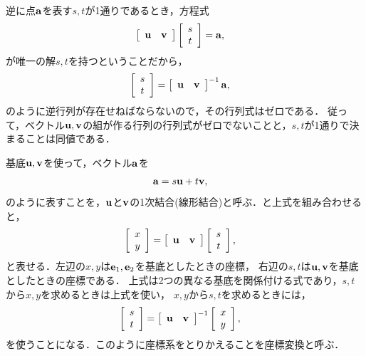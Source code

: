 逆に点${\bf a}$を表す$s,t$が1通りであるとき，方程式
\begin{align}
\left[\begin{array}{cc}
{\bf u} & {\bf v}\end{array}\right]\left[\begin{array}{c}
s\\
t
\end{array}\right] & ={\bf a}, 
\end{align}
が唯一の解$s,t$を持つということだから，
\begin{align}
\left[\begin{array}{c}
s\\
t
\end{array}\right] & =\left[\begin{array}{cc}
{\bf u} & {\bf v}\end{array}\right]^{-1}{\bf a},
\end{align}
のように逆行列が存在せねばならないので，その行列式はゼロである．
従って，ベクトル${\bf u},{\bf v}$の組が作る行列の行列式がゼロでないことと，$s,t$が1通りで決まることは同値である．

基底${\bf u},{\bf v}$を使って，ベクトル${\bf a}$を
\begin{align}
{\bf a} & =s{\bf u}+t{\bf v}, 
\end{align}
のように表すことを，${\bf u}$と${\bf v}$の1次結合(線形結合)と呼ぶ．と上式を組み合わせると，
\begin{align}
\left[\begin{array}{c}
x\\
y
\end{array}\right] & =\left[\begin{array}{cc}
{\bf u} & {\bf v}\end{array}\right]\left[\begin{array}{c}
s\\
t
\end{array}\right], 
\end{align}
と表せる．左辺の$x,y$は${\bf e}_{1},{\bf e}_{2}$を基底としたときの座標，
右辺の$s,t$は${\bf u},{\bf v}$を基底としたときの座標である．
上式は2つの異なる基底を関係付ける式であり，$s,t$から$x,y$を求めるときは上式を使い，
$x,y$から$s,t$を求めるときには，
\begin{align}
\left[\begin{array}{c}
s\\
t
\end{array}\right] & =\left[\begin{array}{cc}
{\bf u} & {\bf v}\end{array}\right]^{-1}\left[\begin{array}{c}
x\\
y
\end{array}\right], \label{LA:coordinate_transform_2D}
\end{align}
を使うことになる．このように座標系をとりかえることを座標変換と呼ぶ．
%
